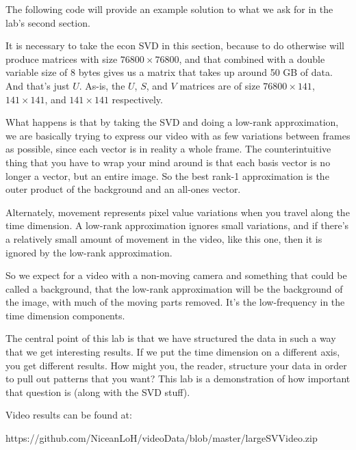 The following code will provide an example solution to what we ask for in the lab's second section.


It is necessary to take the econ SVD in this section, because to do otherwise will produce matrices with size $76800 \times 76800$, and that combined with a double variable size of 8 bytes gives us a matrix that takes up around 50 GB of data. And that's just $U$. As-is, the $U$, $S$, and $V$ matrices are of size $76800\times 141$, $141 \times 141$, and $141 \times 141$ respectively. 

What happens is that by taking the SVD and doing a low-rank approximation, we are basically trying to express our video with as few variations between frames as possible, since each vector is in reality a whole frame. The counterintuitive thing that you have to wrap your mind around is that each basis vector is no longer a vector, but an entire image. So the best rank-1 approximation is the outer product of the background and an all-ones vector.

Alternately, movement represents pixel value variations when you travel along the time dimension. A low-rank approximation ignores small variations, and if there's a relatively small amount of movement in the video, like this one, then it is ignored by the low-rank approximation.

So we expect for a video with a non-moving camera and something that could be called a background, that the low-rank approximation will be the background of the image, with much of the moving parts removed. It's the low-frequency in the time dimension components.

The central point of this lab is that we have structured the data in such a way that we get interesting results. If we put the time dimension on a different axis, you get different results. How might you, the reader, structure your data in order to pull out patterns that you want? This lab is a demonstration of how important that question is (along with the SVD stuff).

Video results can be found at:

https://github.com/NiceanLoH/videoData/blob/master/largeSVVideo.zip

